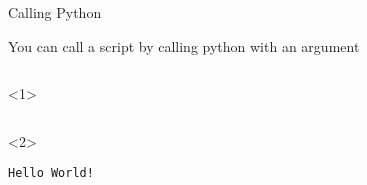 
\begin{frame}[fragile]{Calling Python}

   You can call a script by calling python with an argument

  \begin{columns}[onlytextwidth]
    \begin{column}{\textwidth}
      \begin{onlyenv}<1>
        \begin{lstlisting}[style=sh]
%*\LSTPrompt*) python3 my_script.py
 \end{lstlisting}
      \end{onlyenv}

      \begin{onlyenv}<2>
        \begin{lstlisting}[style=sh]
%*\LSTPrompt*) python3 my_script.py
Hello World! \end{lstlisting}
      \end{onlyenv}

    \end{column}
  \end{columns}
\end{frame}



%
%
%
%
%
%
%
%
%

